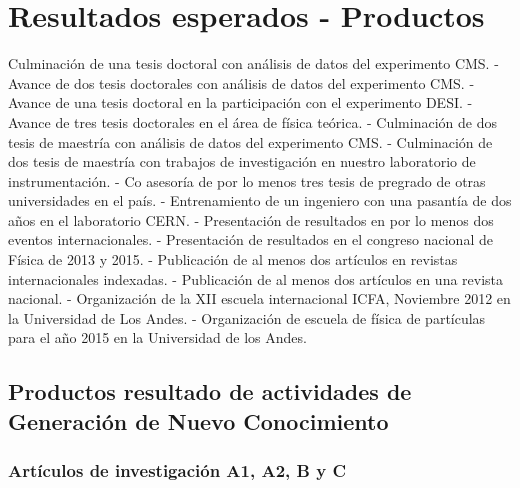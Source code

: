 \documentclass[12pt]{article}
\begin{document}
\section{Resultados esperados - Productos}


Culminación de una tesis doctoral con análisis de datos del experimento CMS.
- Avance de dos tesis doctorales con análisis de datos del experimento CMS.
- Avance de una tesis doctoral en la participación con el experimento DESI.
- Avance de tres tesis doctorales en el área de física teórica.
- Culminación de dos tesis de maestría con análisis de datos del experimento CMS.
- Culminación de dos tesis de maestría con trabajos de investigación en nuestro laboratorio de
instrumentación.
- Co asesoría de por lo menos tres tesis de pregrado de otras universidades en el país.
- Entrenamiento de un ingeniero con una pasantía de dos años en el laboratorio CERN.
- Presentación de resultados en por lo menos dos eventos internacionales.
- Presentación de resultados en el congreso nacional de Física de 2013 y 2015.
- Publicación de al menos dos artículos en revistas internacionales indexadas.
- Publicación de al menos dos artículos en una revista nacional.
- Organización de la XII escuela internacional ICFA, Noviembre 2012 en la Universidad de Los
Andes.
- Organización de escuela de física de partículas para el año 2015 en la Universidad de los
Andes.
 
\subsection{Productos resultado de actividades de Generación de Nuevo
  Conocimiento} 

\subsubsection{Art\'iculos de investigaci\'on A1, A2, B y C}
\end{document}
